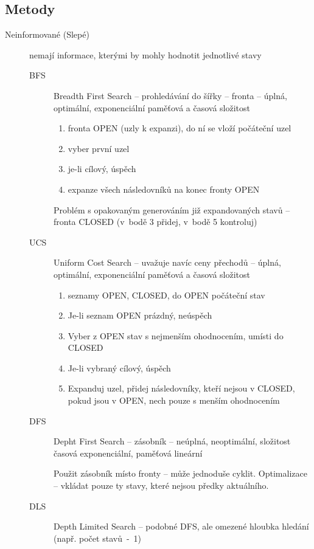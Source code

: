 \documentclass[a4wide]{report}
\begin{document}
\subsection{Metody}
\begin{description}
	\item[Neinformované (Slepé)] nemají informace, kterými by mohly hodnotit jednotlivé stavy
	\begin{description}
		\item[BFS] Breadth First Search -- prohledávání do šířky -- fronta -- úplná, optimální, exponenciální paměťová a časová složitost
		\begin{enumerate}
			\item fronta OPEN (uzly k expanzi), do ní se vloží počáteční uzel
			\item vyber první uzel
			\item je-li cílový, úspěch
			\item expanze všech následovníků na konec fronty OPEN
		\end{enumerate}
		Problém s opakovaným generováním již expandovaných stavů -- fronta CLOSED (v~bodě 3 přidej, v~bodě 5 kontroluj)
		
		\item[UCS] Uniform Cost Search -- uvažuje navíc ceny přechodů -- úplná, optimální, exponenciální paměťová a časová složitost
		\begin{enumerate}
			\item seznamy OPEN, CLOSED, do OPEN počáteční stav
			\item Je-li seznam OPEN prázdný, neúspěch
			\item Vyber z OPEN stav s nejmenším ohodnocením, umísti do CLOSED
			\item Je-li vybraný cílový, úspěch
			\item Expanduj uzel, přidej následovníky, kteří nejsou v CLOSED, pokud jsou v OPEN, nech pouze s menším ohodnocením
		\end{enumerate}
		
		\item[DFS] Depht First Search -- zásobník -- neúplná, neoptimální, složitost časová exponenciální, paměťová lineární
		
		Použit zásobník místo fronty -- může jednoduše cyklit. Optimalizace -- vkládat pouze ty stavy, které nejsou předky aktuálního.
		
		\item[DLS] Depth Limited Search -- podobné DFS, ale omezené hloubka hledání (např. počet stavů~-~1)
		

\end{description}
\end{description}
\end{document}
